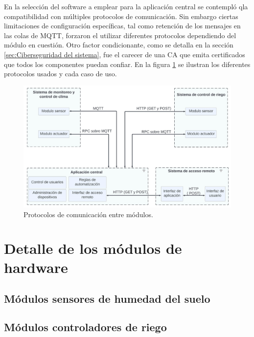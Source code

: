 En la selección del software a emplear para la aplicación central se contempló qla compatibilidad con múltiples protocolos de comunicación. Sin embargo ciertas limitaciones de configuración específicas, tal como retención de los mensajes en las colas de MQTT, forzaron el utilizar diferentes protocolos dependiendo del módulo en cuestión. Otro factor condicionante, como se detalla en la sección \ref{sec:Ciberseguridad del sistema}, fue el carecer de una CA que emita certificados que todos los componentes puedan confiar.
En la figura \ref{fig:blockprotos} se ilustran los diferentes protocolos usados y cada caso de uso. 

\begin{figure}[h]
	\centering
	\includegraphics[width=1.0\textwidth]{./Figures/blockproto.jpg}
	\caption[Protocolos de comunicación entre módulos.]{Protocolos de comunicación entre módulos.}
	\label{fig:blockprotos}

\end{figure}

\section{Detalle de los módulos de hardware}
\label{sec:Módulos de hardware}

\subsection{Módulos sensores de humedad del suelo}
\label{Módulos sensores de humedad del suelo}

\subsection{Módulos controladores de riego}
\label{Módulos controladores de riego}

